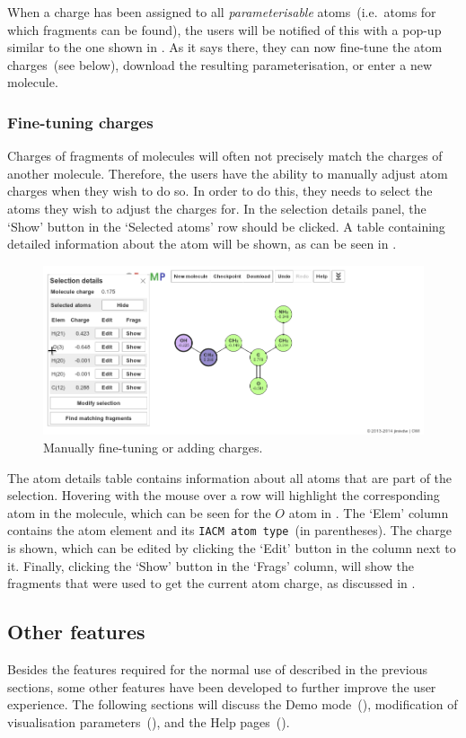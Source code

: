 When a charge has been assigned to all \emph{parameterisable} atoms~(i.e.\ atoms for which fragments can be found), the users will be notified of this with a pop-up similar to the one shown in . As it says there, they can now fine-tune the atom charges~(see below), download the resulting parameterisation, or enter a new molecule.

\subsubsection{Fine-tuning charges}
Charges of fragments of molecules will often not precisely match the charges of another molecule. Therefore, the users have the ability to manually adjust atom charges when they wish to do so. In order to do this, they needs to select the atoms they wish to adjust the charges for. In the selection details panel, the `Show' button in the `Selected atoms' row should be clicked. A table containing detailed information about the atom will be shown, as can be seen in .

\begin{figure}
\center
\includegraphics[width=.9\textwidth]{img/editing.png}
\caption{Manually fine-tuning or adding charges.}
\end{figure}

The atom details table contains information about all atoms that are part of the selection. Hovering with the mouse over a row will highlight the corresponding atom in the molecule, which can be seen for the $O$ atom in . The `Elem' column contains the atom element and its \verb|IACM atom type|~(in parentheses). The charge is shown, which can be edited by clicking the `Edit' button in the column next to it. Finally, clicking the `Show' button in the `Frags' column, will show the fragments that were used to get the current atom charge, as discussed in .


\subsection{Other features}
Besides the features required for the normal use of \oframp{} described in the previous sections, some other features have been developed to further improve the user experience. The following sections will discuss the Demo mode~(), modification of visualisation parameters~(), and the \oframp{} Help pages~().

